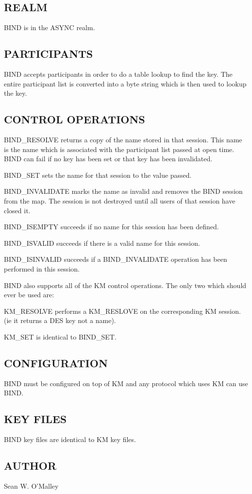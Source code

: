 \noindent 
\subsection*{REALM}

BIND is in the ASYNC realm.

\subsection*{PARTICIPANTS}


BIND accepts participants in order to do a table lookup to find 
the key. The entire participant list is converted into a byte 
string which is then used to lookup the key. 

\subsection*{CONTROL OPERATIONS}

BIND\_RESOLVE returns a copy of the name stored in that session. 
This name is the name which is associated with the participant 
list passed at open time. BIND can fail if no key has been set or 
that key has been invalidated.

BIND\_SET sets the name for that session to the value passed.

BIND\_INVALIDATE marks the name as invalid and removes the BIND 
session from the map. The session is not destroyed until all 
users of that session have closed it. 

BIND\_ISEMPTY succeeds if no name for this session has been 
defined.  

BIND\_ISVALID succeeds if there is a valid name for this session. 

BIND\_ISINVALID succeeds if a BIND\_INVALIDATE operation has 
been performed in this session. 

BIND also supports all of the KM control operations. 
The only two which should ever be used are:

KM\_RESOLVE performs a KM\_RESLOVE on the corresponding 
KM session. (ie it returns a DES key not a name).  

KM\_SET is identical to BIND\_SET.


\subsection*{CONFIGURATION}

BIND must be configured on top of KM and any protocol which uses KM can 
use BIND. 

\subsection*{KEY FILES}

BIND key files are identical to KM key files.

\medskip

\subsection*{AUTHOR}

\noindent Sean W. O'Malley


